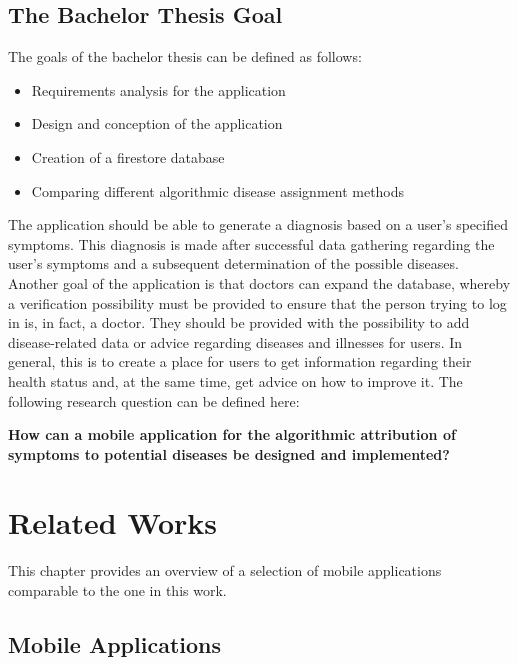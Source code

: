 \section{The Bachelor Thesis Goal}
The goals of the bachelor thesis can be defined as follows:
\begin{itemize}
	\item Requirements analysis for the application
	\item Design and conception of the application
	\item Creation of a firestore database
	\item Comparing different algorithmic disease assignment methods
\end{itemize}
The application should be able to generate a diagnosis based on a user's specified symptoms. This diagnosis is made after successful data gathering regarding the user's symptoms and a subsequent determination of the possible diseases. Another goal of the application is that doctors can expand the database, whereby a verification possibility must be provided to ensure that the person trying to log in is, in fact, a doctor. They should be provided with the possibility to add disease-related data or advice regarding diseases and illnesses for users. In general, this is to create a place for users to get information regarding their health status and, at the same time, get advice on how to improve it. The following research question can be defined here:
\newline \\
\begin{center}
	\textbf{How can a mobile application for the algorithmic attribution of symptoms to potential diseases be designed and implemented?}
\end{center}

\chapter{Related Works}
This chapter provides an overview of a selection of mobile applications comparable to the one in this work.

\section{Mobile Applications}
